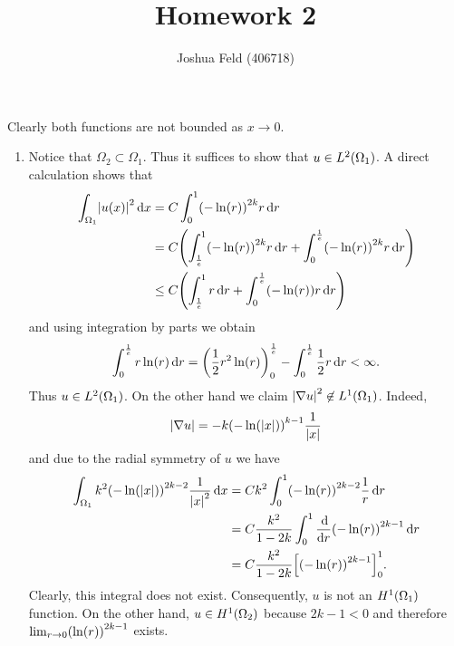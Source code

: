 \documentclass[english]{exercise}
\title{Homework 2}
\author{Joshua Feld (406718)}
\begin{document}
	\maketitle


	\section{}

	Clearly both functions are not bounded as \(x \to 0\).
	\begin{enumerate}
		\item Notice that \(\Omega_2 \subset \Omega_1\).
		Thus it suffices to show that \(u \in L^2\parentheses*{\Omega_1}\).
		A direct calculation shows that
		\begin{align*}
			\int_{\Omega_1}\absolute*{u\parentheses*{x}}^2 \d x &= C\int_0^1 \parentheses*{-\ln\parentheses*{r}}^{2k}r\d r\\
			&= C\parentheses*{\int_{\frac{1}{e}}^1 \parentheses*{-\ln\parentheses*{r}}^{2k}r\d r + \int_0^{\frac{1}{e}}\parentheses*{-\ln\parentheses*{r}}^{2k}r\d r}\\
			&\le C\parentheses*{\int_{\frac{1}{e}}^1 r\d r + \int_0^{\frac{1}{e}}\parentheses*{-\ln\parentheses*{r}}r\d r}
		\end{align*}
		and using integration by parts we obtain
		\[
			\int_0^{\frac{1}{e}}r\ln\parentheses*{r}\d r = \parentheses*{\frac{1}{2}r^2 \ln\parentheses*{r}}_0^{\frac{1}{e}} - \int_0^{\frac{1}{e}}\frac{1}{2}r\d r < \infty.
		\]
		Thus \(u \in L^2\parentheses*{\Omega_1}\).
		On the other hand we claim \(\absolute*{\nabla u}^2 \not\in L^1\parentheses*{\Omega_1}\).
		Indeed,
		\[
			\absolute*{\nabla u} = -k\parentheses*{-\ln\parentheses*{\absolute*{x}}}^{k - 1}\frac{1}{\absolute*{x}}
		\]
		and due to the radial symmetry of \(u\) we have
		\begin{align*}
			\int_{\Omega_1}k^2\parentheses*{-\ln\parentheses*{\absolute*{x}}}^{2k - 2}\frac{1}{\absolute*{x}^2}\d x &= Ck^2 \int_0^1 \parentheses*{-\ln\parentheses*{r}}^{2k - 2}\frac{1}{r}\d r\\
			&= C\frac{k^2}{1 - 2k}\int_0^1 \frac{\d}{\d r}\parentheses*{-\ln\parentheses*{r}}^{2k - 1}\d r\\
			&= C\frac{k^2}{1 - 2k}\brackets*{\parentheses*{-\ln\parentheses*{r}}^{2k - 1}}_0^1.
		\end{align*}
		Clearly, this integral does not exist.
		Consequently, \(u\) is not an \(H^1\parentheses*{\Omega_1}\) function.
		On the other hand, \(u \in H^1\parentheses*{\Omega_2}\) because \(2k - 1 < 0\) and therefore \(\lim_{r \to 0}\parentheses*{\ln\parentheses*{r}}^{2k - 1}\) exists.

\end{enumerate}
\end{document}
